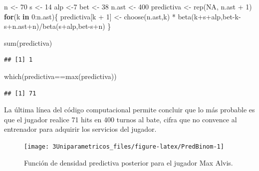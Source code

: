 \documentclass[
  10pt,
  spanish,
]{book}
\newenvironment{Shaded}{\begin{snugshade}}{\end{snugshade}}
\newcommand{\ConstantTok}[1]{\textcolor[rgb]{0.00,0.00,0.00}{#1}}
\newcommand{\ControlFlowTok}[1]{\textcolor[rgb]{0.13,0.29,0.53}{\textbf{#1}}}
\newcommand{\DecValTok}[1]{\textcolor[rgb]{0.00,0.00,0.81}{#1}}
\newcommand{\FunctionTok}[1]{\textcolor[rgb]{0.00,0.00,0.00}{#1}}
\newcommand{\NormalTok}[1]{#1}
\newcommand{\OtherTok}[1]{\textcolor[rgb]{0.56,0.35,0.01}{#1}}
\newcommand{\SpecialCharTok}[1]{\textcolor[rgb]{0.00,0.00,0.00}{#1}}
\theoremstyle{definition}
\theoremstyle{definition}
\theoremstyle{definition}
\theoremstyle{definition}
\theoremstyle{remark}
\begin{document}
\begin{Shaded}
\begin{Highlighting}[]
\NormalTok{n }\OtherTok{\textless{}{-}} \DecValTok{70}
\NormalTok{s }\OtherTok{\textless{}{-}} \DecValTok{14}
\NormalTok{alp }\OtherTok{\textless{}{-}}\DecValTok{7}
\NormalTok{bet }\OtherTok{\textless{}{-}} \DecValTok{38}
\NormalTok{n.ast }\OtherTok{\textless{}{-}} \DecValTok{400}
\NormalTok{predictiva }\OtherTok{\textless{}{-}} \FunctionTok{rep}\NormalTok{(}\ConstantTok{NA}\NormalTok{, n.ast }\SpecialCharTok{+} \DecValTok{1}\NormalTok{)}
\ControlFlowTok{for}\NormalTok{(k }\ControlFlowTok{in} \DecValTok{0}\SpecialCharTok{:}\NormalTok{n.ast)\{}
\NormalTok{  predictiva[k }\SpecialCharTok{+} \DecValTok{1}\NormalTok{] }\OtherTok{\textless{}{-}}
  \FunctionTok{choose}\NormalTok{(n.ast,k) }\SpecialCharTok{*}
    \FunctionTok{beta}\NormalTok{(k}\SpecialCharTok{+}\NormalTok{s}\SpecialCharTok{+}\NormalTok{alp,bet}\SpecialCharTok{{-}}\NormalTok{k}\SpecialCharTok{{-}}\NormalTok{s}\SpecialCharTok{+}\NormalTok{n.ast}\SpecialCharTok{+}\NormalTok{n)}\SpecialCharTok{/}\FunctionTok{beta}\NormalTok{(s}\SpecialCharTok{+}\NormalTok{alp,bet}\SpecialCharTok{{-}}\NormalTok{s}\SpecialCharTok{+}\NormalTok{n)}
\NormalTok{\}}

\FunctionTok{sum}\NormalTok{(predictiva)}
\end{Highlighting}
\end{Shaded}

\begin{verbatim}
## [1] 1
\end{verbatim}

\begin{Shaded}
\begin{Highlighting}[]
\FunctionTok{which}\NormalTok{(predictiva}\SpecialCharTok{==}\FunctionTok{max}\NormalTok{(predictiva))}
\end{Highlighting}
\end{Shaded}

\begin{verbatim}
## [1] 71
\end{verbatim}

La última línea del código computacional permite concluir que lo más probable es que el jugador realice 71 hits en 400 turnos al bate, cifra que no convence al entrenador para adquirir los servicios del jugador.

\begin{figure}

{\centering \texttt{[image: 3Uniparametricos\_files/figure-latex/PredBinom-1]} 

}

\caption{Función de densidad predictiva posterior para el jugador Max Alvis.}\label{fig:PredBinom}
\end{figure}
\end{document}
